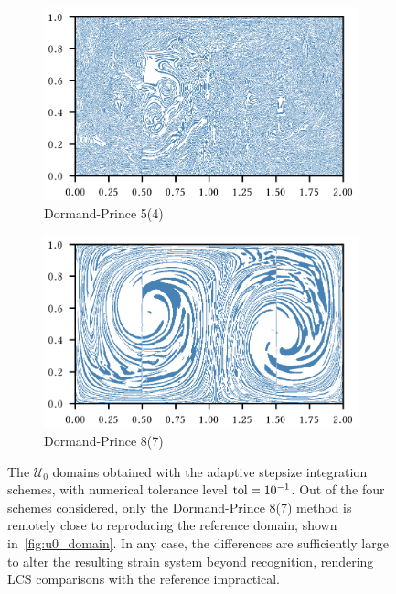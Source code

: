 \begin{figure}[htpb]
    \begin{subfigure}[b]{0.475\textwidth}
        \centering
        \includegraphics{figures/domain_figures/rkdp54_err_half_width.png}
        \caption[]{{\small Dormand-Prince 5(4)}}
        \label{fig:u0_dom_err_dp54}
    \end{subfigure}
    \begin{subfigure}[b]{0.475\textwidth}
        \centering
        \includegraphics{figures/domain_figures/rkdp87_err_half_width.png}
        \caption[]{{\small Dormand-Prince 8(7)}}
        \label{fig:u0_dom_err_dp87}
    \end{subfigure}
    \caption[The $\mathcal{U}_{0}$ domains obtained with the adaptive stepsize
    integration schemes, with numerical tolerance level
    $\textnormal{tol}=10^{-1}$]{
        The $\mathcal{U}_{0}$ domains obtained with the adaptive stepsize
        integration schemes, with numerical tolerance level
        $\textnormal{tol}=10^{-1}$. Out of the four schemes considered, only the
    Dormand-Prince 8(7) method is remotely close to reproducing the
    reference domain, shown in~\ref{fig:u0_domain}. In any case, the
    differences are sufficiently large to alter the resulting strain
    system beyond recognition, rendering LCS comparisons with the reference
    impractical.}
    \label{fig:u0_dom_errs}
\end{figure}

